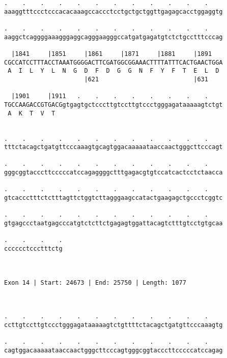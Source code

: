 \documentclass{article}
\begin{document}
\begin{Verbatim}
.    .    .    .    .    .    .    .    .    .    .    .    
aaaggtttccctcccacacaaagccaccctcctgctgctggttgagagcacctggaggtg
                                                            
.    .    .    .    .    .    .    .    .    .    .    .    
aaggctcaggggaaagggaggcagggaagggccatgatgagatgtctctgcctttcccag
                                                            
  |1841     |1851     |1861     |1871     |1881     |1891   
CGCCATCCTTTACCTAAATGGGGACTTCGATGGCGGAAACTTTTATTTCACTGAACTGGA
 A  I  L  Y  L  N  G  D  F  D  G  G  N  F  Y  F  T  E  L  D 
                      |621                          |631    
  
  |1901     |1911   .    .    .    .    .    .    .    .    
TGCCAAGACCGTGACGgtgagtgctcccttgtccttgtccctgggagataaaaagtctgt
 A  K  T  V  T                                              
                                                            
  
.    .    .    .    .    .    .    .    .    .    .    .    
tttctacagctgatgttcccaaagtgcagtggacaaaaataaccaactgggcttcccagt
                                                            
.    .    .    .    .    .    .    .    .    .    .    .    
gggcggtacccttcccccatccagaggggctttgagacgtgtccatcactcctctaacca
                                                            
.    .    .    .    .    .    .    .    .    .    .    .    
gtcaccctttctctttagttctggtcttagggaagccatactgaagagctgccctcggtc
                                                            
.    .    .    .    .    .    .    .    .    .    .    .    
gtgagccctaatgagcccatgtctcttctgagagtggattacagtctttgtcctgtgcaa
                                                            
.    .    .    .
cccccctccctttctg
                
                
 
Exon 14 | Start: 24673 | End: 25750 | Length: 1077



.    .    .    .    .    .    .    .    .    .    .    .    
ccttgtccttgtccctgggagataaaaagtctgttttctacagctgatgttcccaaagtg
                                                            
.    .    .    .    .    .    .    .    .    .    .    .    
cagtggacaaaaataaccaactgggcttcccagtgggcggtacccttcccccatccagag
                                                            

\end{Verbatim}
\end{document}
